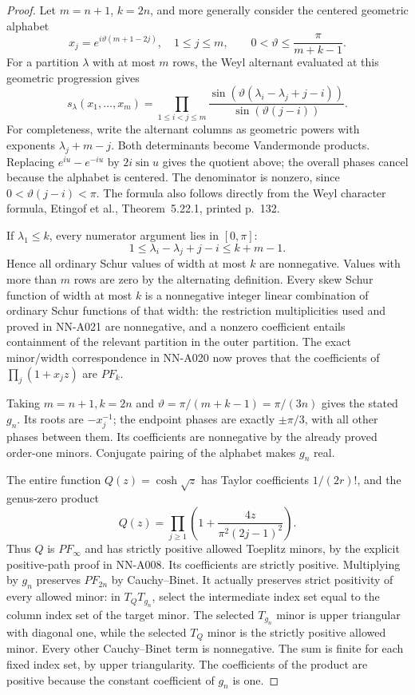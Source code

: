 \begin{proof}
Let $m=n+1$, $k=2n$, and more generally consider the centered
geometric alphabet
\[
 x_j=e^{i\vartheta(m+1-2j)},\quad 1\le j\le m,
                \qquad 0<\vartheta\le\frac{\pi}{m+k-1}.
\]
For a partition $\lambda$ with at most $m$ rows, the Weyl
alternant evaluated at this geometric progression gives
\begin{equation}\label{eq:analytic-geometric-schur-sines}
 s_\lambda(x_1,\ldots,x_m)
     =\prod_{1\le i<j\le m}
        \frac{\sin(\vartheta(\lambda_i-\lambda_j+j-i))}
             {\sin(\vartheta(j-i))}.
\end{equation}
For completeness, write the alternant columns as geometric
powers with exponents $\lambda_j+m-j$. Both determinants
become Vandermonde products. Replacing
$e^{iu}-e^{-iu}$ by $2i\sin u$ gives the quotient above;
the overall phases cancel because the alphabet is centered.
The denominator is nonzero, since $0<\vartheta(j-i)<\pi$.
The formula also follows directly from the Weyl character
formula, Etingof et al., Theorem~5.22.1, printed p.~132.

If $\lambda_1\le k$, every numerator argument lies in $[0,\pi]$:
\[
 1\le\lambda_i-\lambda_j+j-i\le k+m-1.
\]
Hence all ordinary Schur values of width at most $k$ are
nonnegative. Values with more than $m$ rows are zero by the
alternating definition. Every skew Schur function of width
at most $k$ is a nonnegative integer linear combination of
ordinary Schur functions of that width: the restriction
multiplicities used and proved in NN-A021 are nonnegative,
and a nonzero coefficient entails containment of the relevant
partition in the outer partition. The exact minor/width
correspondence in NN-A020 now proves that the coefficients
of $\prod_j(1+x_jz)$ are $PF_k$.

Taking $m=n+1,k=2n$ and
$\vartheta=\pi/(m+k-1)=\pi/(3n)$ gives the stated $g_n$.
Its roots are $-x_j^{-1}$; the endpoint phases are exactly
$\pm\pi/3$, with all other phases between them. Its
coefficients are nonnegative by the already proved order-one
minors. Conjugate pairing of the alphabet makes $g_n$ real.

The entire function $Q(z)=\cosh\sqrt z$ has Taylor coefficients
$1/(2r)!$, and the genus-zero product
\[
 Q(z)=\prod_{j\ge1}\left(1+
                       \frac{4z}{\pi^2(2j-1)^2}\right).
\]
Thus $Q$ is $PF_\infty$ and has strictly positive allowed
Toeplitz minors, by the explicit positive-path proof in
NN-A008. Its coefficients are strictly positive. Multiplying
by $g_n$ preserves $PF_{2n}$ by Cauchy--Binet. It actually
preserves strict positivity of every allowed minor: in
$T_QT_{g_n}$, select the intermediate index set equal to the
column index set of the target minor. The selected
$T_{g_n}$ minor is upper triangular with diagonal one,
while the selected $T_Q$ minor is the strictly positive
allowed minor. Every other Cauchy--Binet term is nonnegative.
The sum is finite for each fixed index set, by upper
triangularity. The coefficients of the product are positive
because the constant coefficient of $g_n$ is one.


\end{proof}
